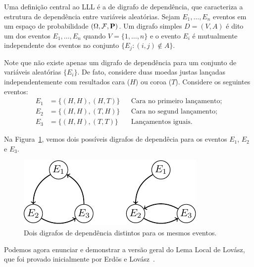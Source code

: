 Uma definição central ao LLL é a de digrafo de dependência, que caracteriza a estrutura de dependência entre variáveis aleatórias. Sejam $E_1, \dots, E_n$ eventos em um espaço de probabilidade $(\Omega, \mathcal{F}, \operatorname{\mathbf{P}})$. Um digrafo simples $D = (V,A)$ é dito um  dos eventos $E_1, \dots, E_n$ quando $V = \{1, \dots, n\}$ e o evento $E_i$ é mutualmente independente dos eventos no conjunto $\{ E_j : (i,j) \not\in A\}$.

Note que não existe apenas um digrafo de dependência para um conjunto de variáveis aleatórias $\{E_i\}$. De fato, considere duas moedas justas lançadas independentemente com resultados cara ($H$) ou coroa ($T$). Considere os seguintes eventos:
\begin{align*}
  E_1 &= \{ (H,H) , (H,T) \} && \text{Cara no primeiro lançamento;}\\
  E_2 &= \{ (H,H) , (T,H) \} && \text{Cara no segund lançamento;}\\
  E_3 &= \{ (H,H) , (T,T) \} && \text{Lançamentos iguais.}
\end{align*}

Na Figura~\ref{prob:fig:ddigraph}, vemos dois possíveis digrafos de dependêcia para os eventos $E_1$, $E_2$ e $E_3$.

\begin{figure}[ht!]
\centering
\includegraphics{figures/4_prob_1_ddigraph}
\caption{Dois digrafos de dependência distintos para os mesmos eventos.}
\label{prob:fig:ddigraph}
\end{figure}

Podemos agora enunciar e demonstrar a versão geral do Lema Local de Lovász, que foi provado inicialmente por Erdös e Lovász~\cite{erdos1975problems}.

